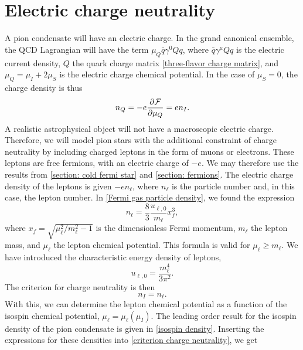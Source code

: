 \section{Electric charge neutrality}
\label{section: charge neturality}


A pion condensate will have an electric charge.
In the grand canonical ensemble, the QCD Lagrangian will have the term  $\mu_Q \bar q \gamma^0 Q q$, where $\bar q \gamma^\mu Q q$ is the electric current density, $Q$ the quark charge matrix \autoref{three-flavor charge matrix}, and $\mu_Q = \mu_I + 2 \mu_S$ is the electric charge chemical potential.
In the case of $\mu_S = 0$, the charge density is thus
%
\begin{equation}
    n_Q = - e \pdv{\mathcal{F}}{\mu_Q} = e n_I.
\end{equation}
%
A realistic astrophysical object will not have a macroscopic electric charge.
Therefore, we will model pion stars with the additional constraint of charge neutrality by including charged leptons in the form of muons or electrons.
These leptons are free fermions, with an electric charge of $- e$.
We may therefore use the results from \autoref{section: cold fermi star} and \autoref{section: fermions}.
The electric charge density of the leptons is given $- e n_\ell$, where $n_\ell$ is the particle number and, in this case, the lepton number.
In \autoref{Fermi gas particle density}, we found the expression
%
\begin{equation}
    \label{lepton density}
    n_{\ell} = \frac{8}{3} 
    \frac{u_{\ell, 0}}{m_\ell} x_f^3,
\end{equation}
%
where $x_f = \sqrt{ {\mu_\ell^2}/{m_\ell^2} - 1}$ is the dimensionless Fermi momentum, $m_\ell$ the lepton mass, and $\mu_\ell$ the lepton chemical potential.
This formula is valid for $\mu_\ell \geq m_\ell$.
We have introduced the characteristic energy density of leptons,
%
\begin{equation}
    u_{\ell, 0} = \frac{m^4_\ell}{3 \pi^2}.
\end{equation}
%
The criterion for charge neutrality is then
%
\begin{equation}
    \label{criterion charge neutrality}
    n_I = n_\ell.
\end{equation}
%
With this, we can determine the lepton chemical potential as a function of the isospin chemical potential, $\mu_\ell = \mu_\ell(\mu_I)$.
The leading order result for the isospin density of the pion condensate is given in \autoref{isospin density}.
Inserting the expressions for these densities into \autoref{criterion charge neutrality}, we get
